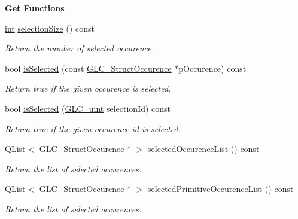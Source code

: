 \begin{Indent}{\bf Get Functions}
\begin{DoxyCompactItemize}
\hyperlink{ioapi_8h_a787fa3cf048117ba7123753c1e74fcd6}{int} \hyperlink{class_g_l_c___world_a31ab4a101330f71f6cd86bd5413adec1}{selection\-Size} () const 
\begin{DoxyCompactList}\small\item\em Return the number of selected occurence. \end{DoxyCompactList}\item 
bool \hyperlink{class_g_l_c___world_a73620cddf826d6c153e99e73a32a58e2}{is\-Selected} (const \hyperlink{class_g_l_c___struct_occurence}{G\-L\-C\-\_\-\-Struct\-Occurence} $\ast$p\-Occurence) const 
\begin{DoxyCompactList}\small\item\em Return true if the given occurence is selected. \end{DoxyCompactList}\item 
bool \hyperlink{class_g_l_c___world_a76d5c961595c38b79432224a689798df}{is\-Selected} (\hyperlink{glc__global_8h_abf950976fabed69026558df8e2da6c6b}{G\-L\-C\-\_\-uint} selection\-Id) const 
\begin{DoxyCompactList}\small\item\em Return true if the given occurence id is selected. \end{DoxyCompactList}\item 
\hyperlink{class_q_list}{Q\-List}$<$ \hyperlink{class_g_l_c___struct_occurence}{G\-L\-C\-\_\-\-Struct\-Occurence} $\ast$ $>$ \hyperlink{class_g_l_c___world_ab3e55f8d797b6ad8cf38449c6f412146}{selected\-Occurence\-List} () const 
\begin{DoxyCompactList}\small\item\em Return the list of selected occurences. \end{DoxyCompactList}\item 
\hyperlink{class_q_list}{Q\-List}$<$ \hyperlink{class_g_l_c___struct_occurence}{G\-L\-C\-\_\-\-Struct\-Occurence} $\ast$ $>$ \hyperlink{class_g_l_c___world_aead725acc33cb2068c3ff200eabeb50c}{selected\-Primitive\-Occurence\-List} () const 
\begin{DoxyCompactList}\small\item\em Return the list of selected occurences. \end{DoxyCompactList}\end{DoxyCompactItemize}
\end{Indent}
